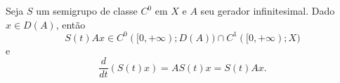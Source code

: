
\begin{theorem}
Seja $S$ um semigrupo de classe $C^0$ em $X$ e $A$ seu gerador infinitesimal. Dado $x\in D(A)$, então 
\[S(t)A x\in C^0([0,+\infty);D(A))\cap C^1([0,+\infty);X)\]
e
\[\frac{d}{dt}\left(S(t)x\right)=AS(t)x=S(t)Ax.\]
\end{theorem}
